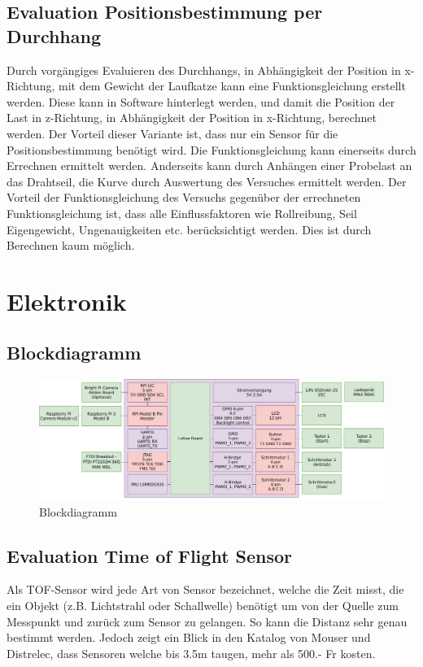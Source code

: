 \documentclass[a4paper]{report}
\begin{document}
\subsection{Evaluation Positionsbestimmung per Durchhang}
\label{app:ssec:EvalPosBestDurch}
Durch vorgängiges Evaluieren des Durchhangs, in Abhängigkeit der Position in x-Richtung, mit dem Gewicht der Laufkatze kann eine Funktionsgleichung erstellt werden. Diese kann in Software hinterlegt werden, und damit die Position der Last in z-Richtung, in Abhängigkeit der Position in x-Richtung, berechnet werden. Der Vorteil dieser Variante ist, dass nur ein Sensor für die Positionsbestimmung benötigt wird. Die Funktionsgleichung kann einerseits durch Errechnen ermittelt werden. Anderseits kann durch Anhängen einer Probelast an das Drahtseil, die Kurve durch Auswertung des Versuches ermittelt werden. Der Vorteil der Funktionsgleichung des Versuchs gegenüber der errechneten Funktionsgleichung ist, dass alle Einflussfaktoren wie Rollreibung, Seil Eigengewicht, Ungenauigkeiten etc. berücksichtigt werden. Dies ist durch Berechnen kaum möglich.

\section{Elektronik}
\label{app:sec:ET}
\subsection{Blockdiagramm}
\label{app:ssec:BlockDiag}

\begin{figure}[h!]
  \includegraphics[keepaspectratio,width=\textwidth]{BlockdiagrammElektronik}
  \caption{Blockdiagramm}
  \label{fig:ElektronikBlockdiagramm}
\end{figure}

\newpage
\subsection{Evaluation Time of Flight Sensor}
\label{app:ssec:EvalTOF}
Als TOF-Sensor wird jede Art von Sensor bezeichnet, welche die Zeit misst, die ein Objekt (z.B. Lichtstrahl oder Schallwelle) benötigt um von der Quelle zum Messpunkt und zurück zum Sensor zu gelangen. So kann die Distanz sehr genau bestimmt werden. Jedoch zeigt ein Blick in den Katalog von Mouser und Distrelec, dass Sensoren welche bis 3.5m taugen, mehr als 500.- Fr kosten.
\end{document}
